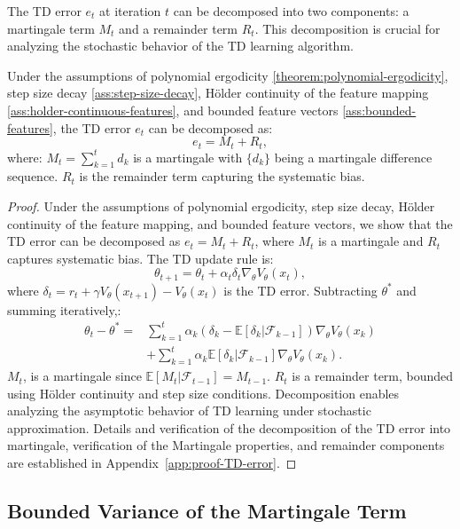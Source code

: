 The TD error \( e_t \) at iteration \( t \) can be decomposed into two components: a martingale term \( M_t \) and a remainder term \( R_t \). This decomposition is crucial for analyzing the stochastic behavior of the TD learning algorithm.

\begin{lemma}
\label{theorem:td-error-decomposition}
Under the assumptions of polynomial ergodicity \ref{theorem:polynomial-ergodicity}, step size decay \ref{ass:step-size-decay}, Hölder continuity of the feature mapping \ref{ass:holder-continuous-features}, and bounded feature vectors \ref{ass:bounded-features}, the TD error \( e_t \) can be decomposed as:
\[
e_t = M_t + R_t,
\]
where: \(M_t = \sum_{k=1}^{t} d_k\) is a martingale with \( \{d_k\} \) being a martingale difference sequence.
\( R_t \) is the remainder term capturing the systematic bias.
\end{lemma}

\begin{proof}
Under the assumptions of polynomial ergodicity, step size decay, Hölder continuity of the feature mapping, and bounded feature vectors, we show that the TD error can be decomposed as \( e_t = M_t + R_t \), where \( M_t \) is a martingale and \( R_t \) captures systematic bias.
The TD update rule is:
\[
\theta_{t+1} = \theta_t + \alpha_t \delta_t \nabla_\theta V_\theta(x_t),
\]
where \( \delta_t = r_t + \gamma V_\theta(x_{t+1}) - V_\theta(x_t) \) is the TD error. Subtracting \( \theta^* \) and summing iteratively,:
\begin{align*}
\theta_t - \theta^* = &\sum_{k=1}^t \alpha_k (\delta_k - \mathbb{E}[\delta_k | \mathcal{F}_{k-1}]) \nabla_\theta V_\theta(x_k)\\ &+ \sum_{k=1}^t \alpha_k \mathbb{E}[\delta_k | \mathcal{F}_{k-1}] \nabla_\theta V_\theta(x_k).
\end{align*}
\( M_t \), is a martingale since \( \mathbb{E}[M_t | \mathcal{F}_{t-1}] = M_{t-1} \). \( R_t \) is a remainder term, bounded using Hölder continuity and step size conditions. Decomposition enables analyzing the asymptotic behavior of TD learning under stochastic approximation.
Details and verification of the decomposition of the TD error into martingale, verification of the Martingale properties, and remainder components are established in Appendix~\ref{app:proof-TD-error}.
\end{proof}

\subsection{Bounded Variance of the Martingale Term}

